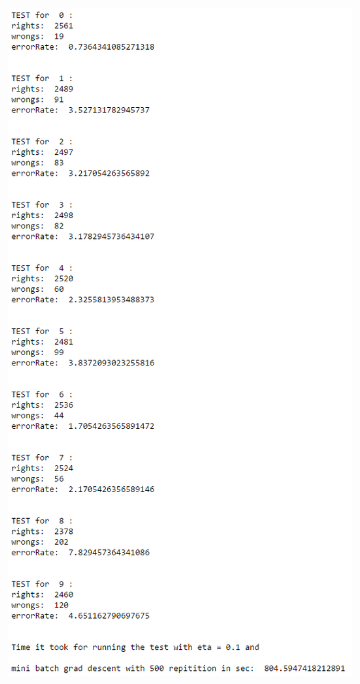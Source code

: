 \documentclass[paper=a4, fontsize=11pt]{scrartcl} %
\numberwithin{equation}{section} %
\numberwithin{figure}{section} %
\numberwithin{table}{section} %
\begin{document}
    \begin{figure}
    	\begin{subfigure}[t]{\textwidth}
    		\centering
    		\includegraphics[height=9.5in]{minibatchrun}
    	\end{subfigure}
    \end{figure}
 
\end{document}
